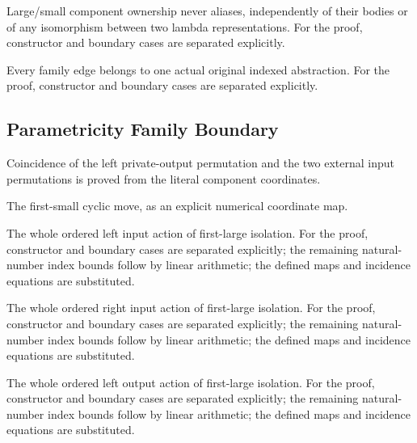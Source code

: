 Large/small component ownership never aliases, independently of their bodies or of any isomorphism between two lambda representations.
For the proof, constructor and boundary cases are separated explicitly.
\par{}

Every family edge belongs to one actual original indexed abstraction.
For the proof, constructor and boundary cases are separated explicitly.
\par{}

\subsection{Parametricity Family Boundary}
Coincidence of the left private-output permutation and the two external input permutations is proved from the literal component coordinates.

The first-small cyclic move, as an explicit numerical coordinate map.
\par{}

The whole ordered left input action of first-large isolation.
For the proof, constructor and boundary cases are separated explicitly; the remaining natural-number index bounds follow by linear arithmetic; the defined maps and incidence equations are substituted.
\par{}

The whole ordered right input action of first-large isolation.
For the proof, constructor and boundary cases are separated explicitly; the remaining natural-number index bounds follow by linear arithmetic; the defined maps and incidence equations are substituted.
\par{}

The whole ordered left output action of first-large isolation.
For the proof, constructor and boundary cases are separated explicitly; the remaining natural-number index bounds follow by linear arithmetic; the defined maps and incidence equations are substituted.
\par{}

